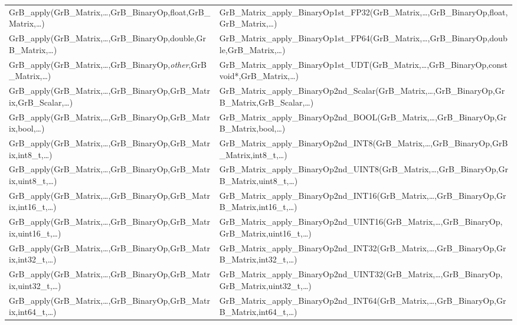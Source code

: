 \begin{landscape}
\begin{table}[htb]
{\begin{tabular}{l|l}
{\sf GrB\_apply(GrB\_Matrix,\ldots,GrB\_BinaryOp,float,GrB\_Matrix,\ldots)}		& {\sf GrB\_Matrix\_apply\_BinaryOp1st\_FP32(GrB\_Matrix,\ldots,GrB\_BinaryOp,float,GrB\_Matrix,\ldots)} \\
{\sf GrB\_apply(GrB\_Matrix,\ldots,GrB\_BinaryOp,double,GrB\_Matrix,\ldots)}	& {\sf GrB\_Matrix\_apply\_BinaryOp1st\_FP64(GrB\_Matrix,\ldots,GrB\_BinaryOp,double,GrB\_Matrix,\ldots)} \\
{\sf GrB\_apply(GrB\_Matrix,\ldots,GrB\_BinaryOp,\emph{other},GrB\_Matrix,\ldots)}		& {\sf GrB\_Matrix\_apply\_BinaryOp1st\_UDT(GrB\_Matrix,\ldots,GrB\_BinaryOp,const void*,GrB\_Matrix,\ldots)} \\
\hline

{\sf GrB\_apply(GrB\_Matrix,\ldots,GrB\_BinaryOp,GrB\_Matrix,GrB\_Scalar,\ldots)}		& {\sf GrB\_Matrix\_apply\_BinaryOp2nd\_Scalar(GrB\_Matrix,\ldots,GrB\_BinaryOp,GrB\_Matrix,GrB\_Scalar,\ldots)} \\
{\sf GrB\_apply(GrB\_Matrix,\ldots,GrB\_BinaryOp,GrB\_Matrix,bool,\ldots)}		& {\sf GrB\_Matrix\_apply\_BinaryOp2nd\_BOOL(GrB\_Matrix,\ldots,GrB\_BinaryOp,GrB\_Matrix,bool,\ldots)} \\
{\sf GrB\_apply(GrB\_Matrix,\ldots,GrB\_BinaryOp,GrB\_Matrix,int8\_t,\ldots)}	& {\sf GrB\_Matrix\_apply\_BinaryOp2nd\_INT8(GrB\_Matrix,\ldots,GrB\_BinaryOp,GrB\_Matrix,int8\_t,\ldots)} \\
{\sf GrB\_apply(GrB\_Matrix,\ldots,GrB\_BinaryOp,GrB\_Matrix,uint8\_t,\ldots)}	& {\sf GrB\_Matrix\_apply\_BinaryOp2nd\_UINT8(GrB\_Matrix,\ldots,GrB\_BinaryOp,GrB\_Matrix,uint8\_t,\ldots)} \\
{\sf GrB\_apply(GrB\_Matrix,\ldots,GrB\_BinaryOp,GrB\_Matrix,int16\_t,\ldots)}	& {\sf GrB\_Matrix\_apply\_BinaryOp2nd\_INT16(GrB\_Matrix,\ldots,GrB\_BinaryOp,GrB\_Matrix,int16\_t,\ldots)} \\
{\sf GrB\_apply(GrB\_Matrix,\ldots,GrB\_BinaryOp,GrB\_Matrix,uint16\_t,\ldots)}	& {\sf GrB\_Matrix\_apply\_BinaryOp2nd\_UINT16(GrB\_Matrix,\ldots,GrB\_BinaryOp,GrB\_Matrix,uint16\_t,\ldots)} \\
{\sf GrB\_apply(GrB\_Matrix,\ldots,GrB\_BinaryOp,GrB\_Matrix,int32\_t,\ldots)}	& {\sf GrB\_Matrix\_apply\_BinaryOp2nd\_INT32(GrB\_Matrix,\ldots,GrB\_BinaryOp,GrB\_Matrix,int32\_t,\ldots)} \\
{\sf GrB\_apply(GrB\_Matrix,\ldots,GrB\_BinaryOp,GrB\_Matrix,uint32\_t,\ldots)}	& {\sf GrB\_Matrix\_apply\_BinaryOp2nd\_UINT32(GrB\_Matrix,\ldots,GrB\_BinaryOp,GrB\_Matrix,uint32\_t,\ldots)} \\
{\sf GrB\_apply(GrB\_Matrix,\ldots,GrB\_BinaryOp,GrB\_Matrix,int64\_t,\ldots)}	& {\sf GrB\_Matrix\_apply\_BinaryOp2nd\_INT64(GrB\_Matrix,\ldots,GrB\_BinaryOp,GrB\_Matrix,int64\_t,\ldots)} \\

\end{tabular}}
\end{table}
\end{landscape}
